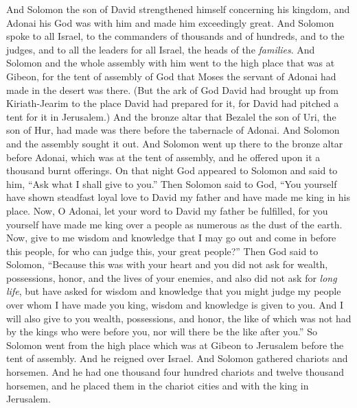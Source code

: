 
\begin{biblechapter} %
 And Solomon the son of David strengthened himself concerning his kingdom, and Adonai his God was with him and made him exceedingly great.
\verse And Solomon spoke to all Israel, to the commanders of thousands and of hundreds, and to the judges, and to all the leaders for all Israel, the heads of the \textit{families}.
\verse And Solomon and the whole assembly with him went to the high place that was at Gibeon, for the tent of assembly of God that Moses the servant of Adonai had made in the desert was there.
\verse (But the ark of God David had brought up from Kiriath-Jearim to the place David had prepared for it, for David had pitched a tent for it in Jerusalem.)
\verse And the bronze altar that Bezalel the son of Uri, the son of Hur, had made was there before the tabernacle of Adonai. And Solomon and the assembly sought it out.
\verse And Solomon went up there to the bronze altar before Adonai, which was at the tent of assembly, and he offered upon it a thousand burnt offerings.
 On that night God appeared to Solomon and said to him, “Ask what I shall give to you.”
\verse Then Solomon said to God, “You yourself have shown steadfast loyal love to David my father and have made me king in his place.
\verse Now, O Adonai, let your word to David my father be fulfilled, for you yourself have made me king over a people as numerous as the dust of the earth.
\verse Now, give to me wisdom and knowledge that I may go out and come in before this people, for who can judge this, your great people?”
\verse Then God said to Solomon, “Because this was with your heart and you did not ask for wealth, possessions, honor, and the lives of your enemies, and also did not ask for \textit{long life}, but have asked for wisdom and knowledge that you might judge my people over whom I have made you king,
\verse wisdom and knowledge is given to you. And I will also give to you wealth, possessions, and honor, the like of which was not had by the kings who were before you, nor will there be the like after you.”
\verse So Solomon went from the high place which was at Gibeon to Jerusalem before the tent of assembly. And he reigned over Israel.
 And Solomon gathered chariots and horsemen. And he had one thousand four hundred chariots and twelve thousand horsemen, and he placed them in the chariot cities and with the king in Jerusalem.

\end{biblechapter}
